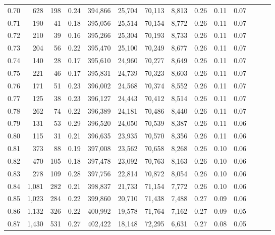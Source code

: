 \begin{tabular}{rrrrrrrrrrrrrr}
0.70 &     628 &    198 &  0.24 &  394,866 &   25,704 &  70,113 &   8,813 &  0.26 &  0.11 &      0.07 \\
0.71 &     190 &     41 &  0.18 &  395,056 &   25,514 &  70,154 &   8,772 &  0.26 &  0.11 &      0.07 \\
0.72 &     210 &     39 &  0.16 &  395,266 &   25,304 &  70,193 &   8,733 &  0.26 &  0.11 &      0.07 \\
0.73 &     204 &     56 &  0.22 &  395,470 &   25,100 &  70,249 &   8,677 &  0.26 &  0.11 &      0.07 \\
0.74 &     140 &     28 &  0.17 &  395,610 &   24,960 &  70,277 &   8,649 &  0.26 &  0.11 &      0.07 \\
0.75 &     221 &     46 &  0.17 &  395,831 &   24,739 &  70,323 &   8,603 &  0.26 &  0.11 &      0.07 \\
0.76 &     171 &     51 &  0.23 &  396,002 &   24,568 &  70,374 &   8,552 &  0.26 &  0.11 &      0.07 \\
0.77 &     125 &     38 &  0.23 &  396,127 &   24,443 &  70,412 &   8,514 &  0.26 &  0.11 &      0.07 \\
0.78 &     262 &     74 &  0.22 &  396,389 &   24,181 &  70,486 &   8,440 &  0.26 &  0.11 &      0.07 \\
0.79 &     131 &     53 &  0.29 &  396,520 &   24,050 &  70,539 &   8,387 &  0.26 &  0.11 &      0.06 \\
0.80 &     115 &     31 &  0.21 &  396,635 &   23,935 &  70,570 &   8,356 &  0.26 &  0.11 &      0.06 \\
0.81 &     373 &     88 &  0.19 &  397,008 &   23,562 &  70,658 &   8,268 &  0.26 &  0.10 &      0.06 \\
0.82 &     470 &    105 &  0.18 &  397,478 &   23,092 &  70,763 &   8,163 &  0.26 &  0.10 &      0.06 \\
0.83 &     278 &    109 &  0.28 &  397,756 &   22,814 &  70,872 &   8,054 &  0.26 &  0.10 &      0.06 \\
0.84 &   1,081 &    282 &  0.21 &  398,837 &   21,733 &  71,154 &   7,772 &  0.26 &  0.10 &      0.06 \\
0.85 &   1,023 &    284 &  0.22 &  399,860 &   20,710 &  71,438 &   7,488 &  0.27 &  0.09 &      0.06 \\
0.86 &   1,132 &    326 &  0.22 &  400,992 &   19,578 &  71,764 &   7,162 &  0.27 &  0.09 &      0.05 \\
0.87 &   1,430 &    531 &  0.27 &  402,422 &   18,148 &  72,295 &   6,631 &  0.27 &  0.08 &      0.05 \\

\end{tabular}
